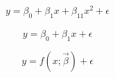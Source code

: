 \documentclass[12pt]{article}
\begin{document}
\pagestyle{empty}
\Large
{}
\pagecolor{ehandbook}

\boldmath
\begin{eqnarray*}
y = \beta_0 + \beta_1 x + \beta_{11} x^2 + \epsilon
\end{eqnarray*}

\[
y = \beta_0 + \beta_1 x + \epsilon
\]

\[
y = f(x; \vec{\beta}) + \epsilon
\]
\end{document}
